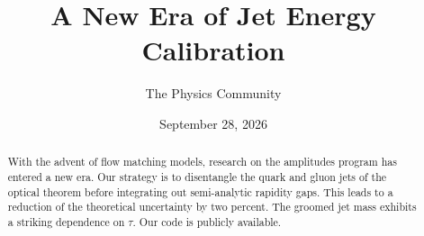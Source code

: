 \documentclass[11pt]{article}
\title{A New Era of Jet Energy Calibration}
\author{The Physics Community}
\date{September 28, 2026}
\numberwithin{equation}{section}
\theoremstyle{definition}
\theoremstyle{remark}
\begin{document}
\maketitle
\begin{abstract}
With the advent of flow matching models, research on the amplitudes
program has entered a new era. Our strategy is to disentangle the quark
and gluon jets of the optical theorem before integrating out
semi-analytic rapidity gaps. This leads to a reduction of the
theoretical uncertainty by two percent. The groomed jet mass exhibits a
striking dependence on $\tau$. Our code is publicly available.
\end{abstract}
\tableofcontents





\nocite{*}


\end{document}
